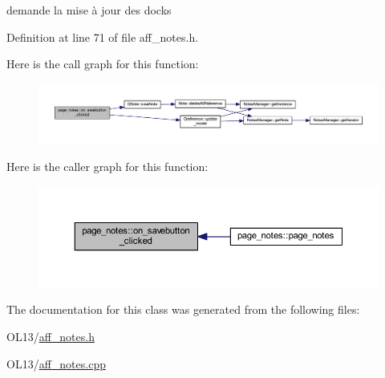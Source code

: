 demande la mise à jour des docks 

Definition at line 71 of file aff\+\_\+notes.\+h.

Here is the call graph for this function\+:\nopagebreak
\begin{figure}[H]
\begin{center}
\leavevmode
\includegraphics[width=350pt]{classpage__notes_a3810696feb56abdad663cb7ae4b2f1b0_cgraph}
\end{center}
\end{figure}
Here is the caller graph for this function\+:\nopagebreak
\begin{figure}[H]
\begin{center}
\leavevmode
\includegraphics[width=350pt]{classpage__notes_a3810696feb56abdad663cb7ae4b2f1b0_icgraph}
\end{center}
\end{figure}


The documentation for this class was generated from the following files\+:\begin{DoxyCompactItemize}
\item 
O\+L13/\hyperlink{aff__notes_8h}{aff\+\_\+notes.\+h}\item 
O\+L13/\hyperlink{aff__notes_8cpp}{aff\+\_\+notes.\+cpp}\end{DoxyCompactItemize}
